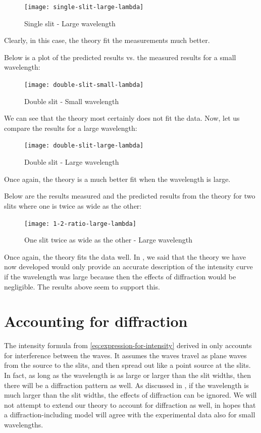 \documentclass{paper}
\begin{document}
\begin{figure}[H]
\label{fig:single-slit-large-lambda}
\caption{Single slit - Large wavelength}
    \texttt{[image: single-slit-large-lambda]}
\end{figure} 

Clearly, in this case, the theory fit the measurements much better.

Below is a plot of the predicted results vs. the measured results for a small wavelength:

\begin{figure}[H]
\label{fig:double-slit-small-lambda}
\caption{Double slit - Small wavelength}
    \texttt{[image: double-slit-small-lambda]}
\end{figure}

We can see that the theory most certainly does not fit the data.
Now, let us compare the results for a large wavelength:

\begin{figure}[H]
\label{fig:double-slit-large-lambda}
\caption{Double slit - Large wavelength}
    \texttt{[image: double-slit-large-lambda]}
\end{figure}

Once again, the theory is a much better fit when the wavelength is
large.

Below are the results measured and the predicted results from the theory
for two slits where one is twice as wide as the other:

\begin{figure}[H]
\label{fig:1-2-ratio-large-lambda}
\caption{One slit twice as wide as the other - Large wavelength}
    \texttt{[image: 1-2-ratio-large-lambda]}
\end{figure}

Once again, the theory fits the data well.
In , we said that the theory we have now developed
would only provide an accurate description of the intensity curve if the wavelength was large because
then the effects of diffraction would be negligible.
The results above seem to support this.

\section{Accounting for diffraction}
\label{section:accounting-for-diffraction}

The intensity formula from \eqref{eq:expression-for-intensity} derived in  only accounts for interference between the waves. It assumes the waves travel as plane waves from the source to the slits, and then spread out like a point source at the slits. In fact, as long as the wavelength is as large or larger than the slit widths, then there will be a diffraction pattern as well. As discussed in , if the wavelength is much larger than the slit widths, the effects of diffraction can be ignored. We will not attempt to extend our theory to account for diffraction as well, in hopes that a diffraction-including model will agree with the experimental data also for small wavelengths.
\end{document}

